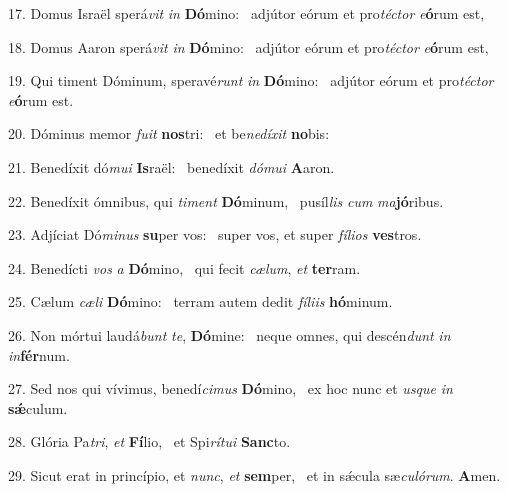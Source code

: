 17. Domus Israël sperá\textit{vit} \textit{in} \textbf{Dó}mino: \ast\  adjútor eórum et pro\textit{téc}\textit{tor} \textit{e}\textbf{ó}rum est,\

18. Domus Aaron sperá\textit{vit} \textit{in} \textbf{Dó}mino: \ast\  adjútor eórum et pro\textit{téc}\textit{tor} \textit{e}\textbf{ó}rum est,\

19. Qui timent Dóminum, speravé\textit{runt} \textit{in} \textbf{Dó}mino: \ast\  adjútor eórum et pro\textit{téc}\textit{tor} \textit{e}\textbf{ó}rum est.\

20. Dóminus memor \textit{fu}\textit{it} \textbf{nos}tri: \ast\  et be\textit{ne}\textit{dí}\textit{xit} \textbf{no}bis:\

21. Benedíxit dó\textit{mu}\textit{i} \textbf{Is}raël: \ast\  benedíxit \textit{dó}\textit{mu}\textit{i} \textbf{A}aron.\

22. Benedíxit ómnibus, qui \textit{ti}\textit{ment} \textbf{Dó}minum, \ast\  pusíl\textit{lis} \textit{cum} \textit{ma}\textbf{jó}ribus.\

23. Adjíciat Dó\textit{mi}\textit{nus} \textbf{su}per vos: \ast\  super vos, et super \textit{fí}\textit{li}\textit{os} \textbf{ves}tros.\

24. Benedícti \textit{vos} \textit{a} \textbf{Dó}mino, \ast\  qui fecit \textit{cæ}\textit{lum}, \textit{et} \textbf{ter}ram.\

25. Cælum \textit{cæ}\textit{li} \textbf{Dó}mino: \ast\  terram autem dedit \textit{fí}\textit{li}\textit{is} \textbf{hó}minum.\

26. Non mórtui laudá\textit{bunt} \textit{te}, \textbf{Dó}mine: \ast\  neque omnes, qui descén\textit{dunt} \textit{in} \textit{in}\textbf{fér}num.\

27. Sed nos qui vívimus, benedí\textit{ci}\textit{mus} \textbf{Dó}mino, \ast\  ex hoc nunc et \textit{us}\textit{que} \textit{in} \textbf{sǽ}culum.\

28. Glória Pa\textit{tri}, \textit{et} \textbf{Fí}lio, \ast\  et Spi\textit{rí}\textit{tu}\textit{i} \textbf{Sanc}to.\

29. Sicut erat in princípio, et \textit{nunc}, \textit{et} \textbf{sem}per, \ast\  et in sǽcula sæ\textit{cu}\textit{ló}\textit{rum}. \textbf{A}men.\

